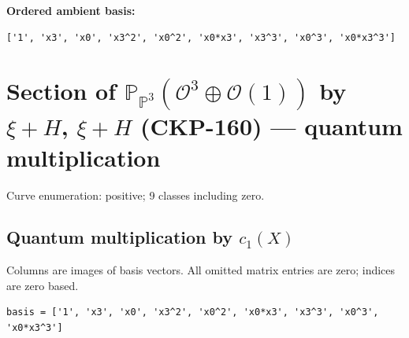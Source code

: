 \documentclass[10pt,a4paper]{article}
\begin{document}
\textbf{Ordered ambient basis:}
\begin{lstlisting}
['1', 'x3', 'x0', 'x3^2', 'x0^2', 'x0*x3', 'x3^3', 'x0^3', 'x0*x3^3']
\end{lstlisting}

\clearpage\section*{Section of $\mathbb P_{\mathbb P^{3}}(\mathcal O^{3}\oplus \mathcal O(1))$ by $\xi +H$, $\xi +H$ (CKP-160) --- quantum multiplication}

Curve enumeration: positive; 9 classes including zero.
\subsection*{Quantum multiplication by $c_1(X)$}
Columns are images of basis vectors. All omitted matrix entries are zero; indices are zero based.

\begin{lstlisting}
basis = ['1', 'x3', 'x0', 'x3^2', 'x0^2', 'x0*x3', 'x3^3', 'x0^3', 'x0*x3^3']
\end{lstlisting}
\end{document}

